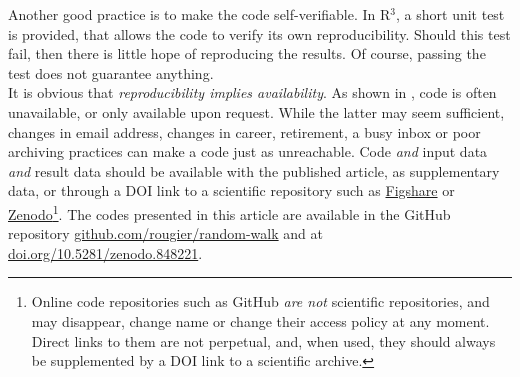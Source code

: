 \documentclass[a4paper,11pt]{article}
\begin{document}
Another good practice is to make the code self-verifiable. In R$^3$, a short unit test is provided, that allows the code to verify its own reproducibility. Should this test fail, then there is little hope of reproducing the results. Of course, passing the test does not guarantee anything.\\

It is obvious that \emph{reproducibility implies availability}. As shown in \citep{Collberg:2016}, code is often unavailable, or only available upon request. While the latter may seem sufficient, changes in email address, changes in career, retirement, a busy inbox or poor archiving practices can make a code just as unreachable. Code \emph{and} input data \emph{and} result data should be available with the published article, as supplementary data, or through a DOI link to a scientific repository such as \href{https://figshare.com}{Figshare} or \href{https://zenodo.org}{Zenodo}\footnote{Online code repositories such as GitHub \emph{are not} scientific repositories, and may disappear, change name or change their access policy at any moment. Direct links to them are not perpetual, and, when used, they should always be supplemented by a DOI link to a scientific archive.}. The codes presented in this article are available in the GitHub repository \href{https://github.com/rougier/random-walk}{github.com/rougier/random-walk} and at \href{https://doi.org/10.5281/zenodo.848221}{doi.org/10.5281/zenodo.848221}.\\
\end{document}

